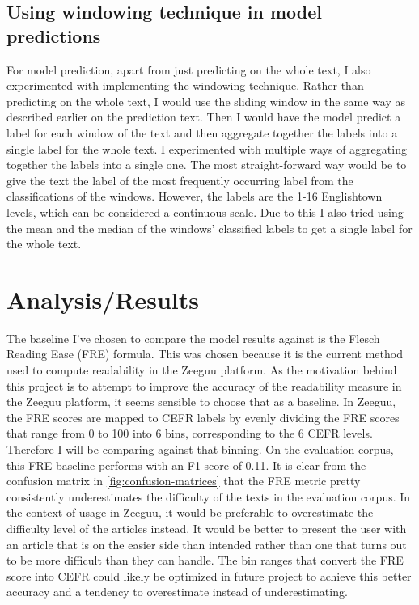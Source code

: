 \documentclass[11pt,a4paper]{article}
\begin{document}
\subsection{Using windowing technique in model predictions}

For model prediction, apart from just predicting on the whole text, I also
experimented with implementing the windowing technique. Rather than predicting
on the whole text, I would use the sliding window in the same way as described
earlier on the prediction text. Then I would have the model predict a label for
each window of the text and then aggregate together the labels into a single label
for the whole text. I experimented with multiple ways of aggregating together the
labels into a single one. The most straight-forward way would be to give the
text the label of the most frequently occurring label from the classifications
of the windows. However, the labels are the 1-16 Englishtown levels, which can
be considered a continuous scale. Due to this I also tried using the mean and
the median of the windows' classified labels to get a single label for the
whole text.

\section{Analysis/Results}

The baseline I've chosen to compare the model results against is the Flesch
Reading Ease (FRE) formula. This was chosen because it is the current method
used to compute readability in the Zeeguu platform. As the motivation behind
this project is to attempt to improve the accuracy of the readability measure
in the Zeeguu platform, it seems sensible to choose that as a baseline. In
Zeeguu, the FRE scores are mapped to CEFR labels by evenly dividing the FRE
scores that range from 0 to 100 into 6 bins, corresponding to the 6 CEFR
levels. Therefore I will be comparing against that binning. On the evaluation
corpus, this FRE baseline performs with an F1 score of 0.11. It is clear from
the confusion matrix in \autoref{fig:confusion-matrices} that the FRE
metric pretty consistently underestimates the difficulty of the texts in the
evaluation corpus. In the context of usage in Zeeguu, it would be preferable to
overestimate the difficulty level of the articles instead. It would be better
to present the user with an article that is on the easier side than intended
rather than one that turns out to be more difficult than they can handle.
The bin ranges that convert the FRE score into CEFR could likely be optimized in
future project to achieve this better accuracy and a tendency to overestimate
instead of underestimating.
\end{document}
